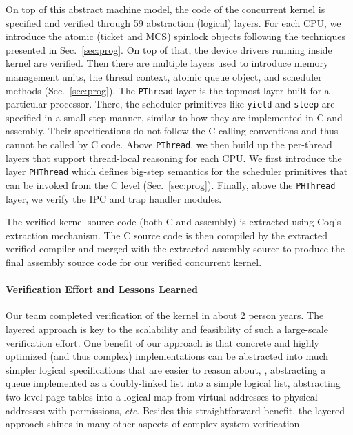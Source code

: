 On top of this abstract machine model, the code of the concurrent kernel is specified and 
verified through 59 abstraction (logical) layers. For each CPU,
we introduce the atomic (ticket and MCS) spinlock objects following
the techniques presented in Sec.~\ref{sec:prog}.
On top of that, the device drivers running inside kernel are verified.
Then there are multiple layers used to introduce memory management units,
the thread context, atomic queue object, and scheduler methods (\cf Sec.~\ref{sec:prog}).
The \texttt{PThread} layer is the topmost layer built for a particular processor.
There, the scheduler primitives like \texttt{yield} and \texttt{sleep}
are specified in a small-step manner, similar to how they are implemented
in C and assembly. Their specifications do not follow the C calling conventions
and thus cannot be called by C code. Above \texttt{PThread}, we then build up the 
per-thread layers that support thread-local reasoning for each CPU.
We first introduce the layer \texttt{PHThread} which defines big-step semantics for
the scheduler primitives that can be invoked from the C level (\cf Sec.~\ref{sec:prog}).
Finally, above the \texttt{PHThread} layer, we verify the
IPC and trap handler modules.

The verified kernel source code (both C and assembly) is extracted using 
Coq's extraction mechanism. The C source code is then compiled by the
extracted verified compiler and merged with the extracted assembly source to
produce the final assembly source code for our verified concurrent kernel. 

\paragraph{Verification Effort and Lessons Learned}
Our team completed verification of the \cCTOS{} kernel in about 2 person years.
The layered approach is key to the scalability and feasibility of such a
large-scale verification effort.
One benefit of our approach is that
concrete and highly optimized (and thus complex) implementations can be abstracted
into much simpler logical specifications that are easier to reason about,
\eg, abstracting a queue implemented as a doubly-linked list into a simple logical list,
abstracting two-level page tables into a logical map from virtual addresses
to physical addresses with permissions, {\it etc}.
Besides this straightforward benefit, the layered approach shines in many other
aspects of complex system verification.

